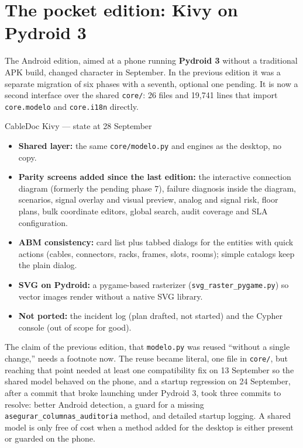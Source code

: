 \documentclass[10.4pt,twocolumn]{article}
\begin{document}
\section{The pocket edition: Kivy on Pydroid 3}

The Android edition, aimed at a phone running \textbf{Pydroid 3} without a traditional APK build, changed character in September. In the previous edition it was a separate migration of six phases with a seventh, optional one pending. It is now a second interface over the shared \texttt{core/}: 26 files and 19{,}741 lines that import \texttt{core.modelo} and \texttt{core.i18n} directly.

\begin{specbox}{CableDoc Kivy --- state at 28 September}
\begin{itemize}[leftmargin=1.0em,itemsep=1pt,topsep=2pt]
\item \textbf{Shared layer:} the same \texttt{core/modelo.py} and engines as the desktop, no copy.
\item \textbf{Parity screens added since the last edition:} the interactive connection diagram (formerly the pending phase 7), failure diagnosis inside the diagram, scenarios, signal overlay and visual preview, analog and signal risk, floor plans, bulk coordinate editors, global search, audit coverage and SLA configuration.
\item \textbf{ABM consistency:} card list plus tabbed dialogs for the entities with quick actions (cables, connectors, racks, frames, slots, rooms); simple catalogs keep the plain dialog.
\item \textbf{SVG on Pydroid:} a pygame-based rasterizer (\texttt{svg\_raster\_pygame.py}) so vector images render without a native SVG library.
\item \textbf{Not ported:} the incident log (plan drafted, not started) and the Cypher console (out of scope for good).
\end{itemize}
\end{specbox}

The claim of the previous edition, that \texttt{modelo.py} was reused ``without a single change,'' needs a footnote now. The reuse became literal, one file in \texttt{core/}, but reaching that point needed at least one compatibility fix on 13 September so the shared model behaved on the phone, and a startup regression on 24 September, after a commit that broke launching under Pydroid 3, took three commits to resolve: better Android detection, a guard for a missing \texttt{asegurar\_columnas\_auditoria} method, and detailed startup logging. A shared model is only free of cost when a method added for the desktop is either present or guarded on the phone.
\end{document}
